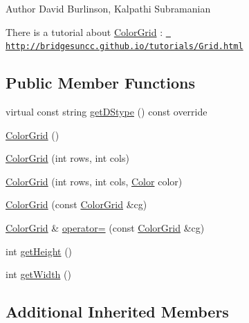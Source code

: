 \begin{DoxyAuthor}{Author}
David Burlinson, Kalpathi Subramanian
\end{DoxyAuthor}
There is a tutorial about \mbox{\hyperlink{classbridges_1_1datastructure_1_1_color_grid}{Color\+Grid}} \+: \href{http://bridgesuncc.github.io/tutorials/Grid.html}{\texttt{ http\+://bridgesuncc.\+github.\+io/tutorials/\+Grid.\+html}} \subsection*{Public Member Functions}
\begin{DoxyCompactItemize}
\item 
virtual const string \mbox{\hyperlink{classbridges_1_1datastructure_1_1_color_grid_afad945d648b427ca183a1dface8249b7}{get\+D\+Stype}} () const override
\item 
\mbox{\hyperlink{classbridges_1_1datastructure_1_1_color_grid_afe6bd7f8bf0dddd889ad7b6c159e928a}{Color\+Grid}} ()
\item 
\mbox{\hyperlink{classbridges_1_1datastructure_1_1_color_grid_a96a8df5eab72fb32c358ba12f2d4483b}{Color\+Grid}} (int rows, int cols)
\item 
\mbox{\hyperlink{classbridges_1_1datastructure_1_1_color_grid_a28f65f52274748d314ee47089e961c2c}{Color\+Grid}} (int rows, int cols, \mbox{\hyperlink{classbridges_1_1datastructure_1_1_color}{Color}} color)
\item 
\mbox{\hyperlink{classbridges_1_1datastructure_1_1_color_grid_adf9b21649638aec97394825d6d09f34c}{Color\+Grid}} (const \mbox{\hyperlink{classbridges_1_1datastructure_1_1_color_grid}{Color\+Grid}} \&cg)
\item 
\mbox{\hyperlink{classbridges_1_1datastructure_1_1_color_grid}{Color\+Grid}} \& \mbox{\hyperlink{classbridges_1_1datastructure_1_1_color_grid_abb8b358357bdccbd22fea5cea4a9862e}{operator=}} (const \mbox{\hyperlink{classbridges_1_1datastructure_1_1_color_grid}{Color\+Grid}} \&cg)
\item 
int \mbox{\hyperlink{classbridges_1_1datastructure_1_1_color_grid_ab437905ec904f941cd58d3393c3a5700}{get\+Height}} ()
\item 
int \mbox{\hyperlink{classbridges_1_1datastructure_1_1_color_grid_a46b358c31927e34f2068202e0cc23ae0}{get\+Width}} ()
\end{DoxyCompactItemize}
\subsection*{Additional Inherited Members}


